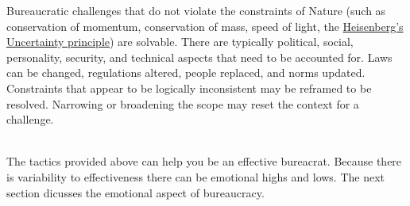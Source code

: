 Bureaucratic challenges that do not violate the constraints of Nature (such as conservation of momentum, conservation of mass, speed of light, the \href{https://en.wikipedia.org/wiki/Uncertainty_principle}{Heisenberg's Uncertainty principle}) 
are solvable. There are typically political, social, personality, security, and technical aspects that need to be accounted for. Laws can be changed, regulations altered, people replaced, and norms updated. Constraints that appear to be logically inconsistent may be reframed to be resolved. Narrowing or broadening the scope may reset the context for a challenge.

\ \\


The tactics provided above can help you be an effective bureacrat. Because there is variability to effectiveness there can be emotional highs and lows. The next section dicusses the emotional aspect of bureaucracy.
